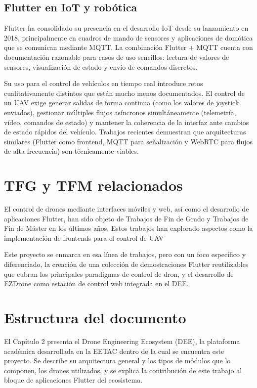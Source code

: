 \subsection{Flutter en IoT y robótica}
Flutter ha consolidado su presencia en el desarrollo IoT desde su lanzamiento en 2018\cite{flutter}, principalmente en cuadros de mando de sensores y aplicaciones de domótica que se comunican mediante MQTT. La combinación Flutter + MQTT\cite{mqtt_dart} cuenta con documentación razonable para casos de uso sencillos: lectura de valores de sensores, visualización de estado y envío de comandos discretos.

Su uso para el control de vehículos en tiempo real introduce retos cualitativamente distintos que están mucho menos documentados. El control de un UAV exige generar salidas de forma continua (como los valores de joystick enviados), gestionar múltiples flujos asíncronos simultáneamente (telemetría, vídeo, comandos de estado) y mantener la coherencia de la interfaz ante cambios de estado rápidos del vehículo. Trabajos recientes demuestran que arquitecturas similares (Flutter como frontend, MQTT para señalización y WebRTC para flujos de alta frecuencia) son técnicamente viables\cite{sun2025}. 

\section{TFG y TFM relacionados}
El control de drones mediante interfaces móviles y web, así como el desarrollo de aplicaciones Flutter, han sido objeto de Trabajos de Fin de Grado y Trabajos de Fin de Máster en los últimos años. Estos trabajos han explorado aspectos como la implementación de frontends para el control de UAV 

Este proyecto se enmarca en esa línea de trabajos, pero con un foco específico y diferenciado, la creación de una colección de demostraciones Flutter reutilizables que cubran los principales paradigmas de control de dron, y el desarrollo de EZDrone como estación de control web integrada en el DEE. 


\section{Estructura del documento}
El Capítulo 2 presenta el Drone Engineering Ecosystem (DEE), la plataforma académica desarrollada en la EETAC dentro de la cual se encuentra este proyecto. Se describe su arquitectura general y los tipos de módulos que lo componen, los drones utilizados, y se explica la contribución de este trabajo al bloque de aplicaciones Flutter del ecosistema.

